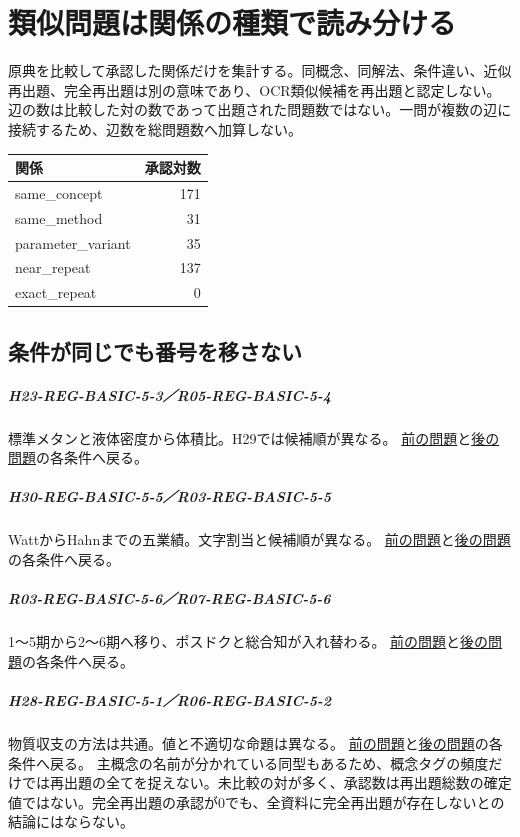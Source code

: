 \chapter{類似問題は関係の種類で読み分ける}
原典を比較して承認した関係だけを集計する。同概念、同解法、条件違い、近似再出題、完全再出題は別の意味であり、OCR類似候補を再出題と認定しない。辺の数は比較した対の数であって出題された問題数ではない。一問が複数の辺に接続するため、辺数を総問題数へ加算しない。
\begin{longtable}{p{.65\linewidth}r}
関係 & 承認対数\\\hline
same\_concept & 171\\
same\_method & 31\\
parameter\_variant & 35\\
near\_repeat & 137\\
exact\_repeat & 0\\
\end{longtable}
\section{条件が同じでも番号を移さない}
\paragraph{H23-REG-BASIC-5-3／R05-REG-BASIC-5-4} 標準メタンと液体密度から体積比。H29では候補順が異なる。 \hyperref[q:h23-reg-basic-5-3]{前の問題}と\hyperref[q:r05-reg-basic-5-4]{後の問題}の各条件へ戻る。
\paragraph{H30-REG-BASIC-5-5／R03-REG-BASIC-5-5} WattからHahnまでの五業績。文字割当と候補順が異なる。 \hyperref[q:h30-reg-basic-5-5]{前の問題}と\hyperref[q:r03-reg-basic-5-5]{後の問題}の各条件へ戻る。
\paragraph{R03-REG-BASIC-5-6／R07-REG-BASIC-5-6} 1〜5期から2〜6期へ移り、ポスドクと総合知が入れ替わる。 \hyperref[q:r03-reg-basic-5-6]{前の問題}と\hyperref[q:r07-reg-basic-5-6]{後の問題}の各条件へ戻る。
\paragraph{H28-REG-BASIC-5-1／R06-REG-BASIC-5-2} 物質収支の方法は共通。値と不適切な命題は異なる。 \hyperref[q:h28-reg-basic-5-1]{前の問題}と\hyperref[q:r06-reg-basic-5-2]{後の問題}の各条件へ戻る。
主概念の名前が分かれている同型もあるため、概念タグの頻度だけでは再出題の全てを捉えない。未比較の対が多く、承認数は再出題総数の確定値ではない。完全再出題の承認が0でも、全資料に完全再出題が存在しないとの結論にはならない。
